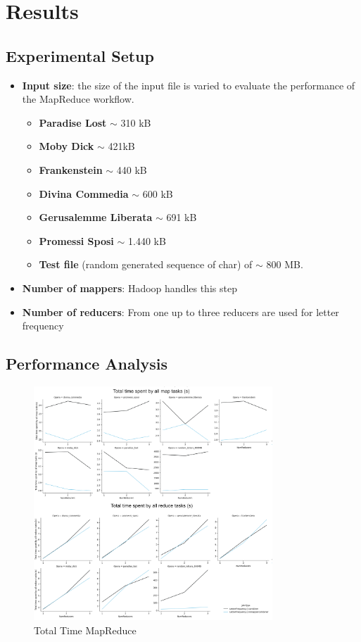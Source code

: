 \newpage
\section{Results}
\subsection{Experimental Setup}
\begin{itemize}
  \item \textbf{Input size}: the size of the input file is varied to evaluate the performance of the MapReduce workflow.
        \begin{itemize}
          \item \textbf{Paradise Lost} $\sim$ 310 kB
          \item \textbf{Moby Dick} $\sim$ 421kB
          \item \textbf{Frankenstein} $\sim$ 440 kB
          \item \textbf{Divina Commedia} $\sim$ 600 kB
          \item \textbf{Gerusalemme Liberata} $\sim$ 691 kB
          \item \textbf{Promessi Sposi} $\sim$ 1.440 kB
          \item \textbf{Test file} (random generated sequence of char) of $\sim$ 800 MB.
        \end{itemize}
  \item \textbf{Number of mappers}: Hadoop handles this step
  \item \textbf{Number of reducers}: From one up to three reducers are used for letter frequency
\end{itemize}

\subsection{Performance Analysis}
  
\begin{figure}[H]
  \centering
  \includegraphics[width=0.8\textwidth]{media/performance/TotalTimeMapReduce.png}
  \caption{Total Time MapReduce}
  \label{fig:TotalTimeMapReduce}
\end{figure}

